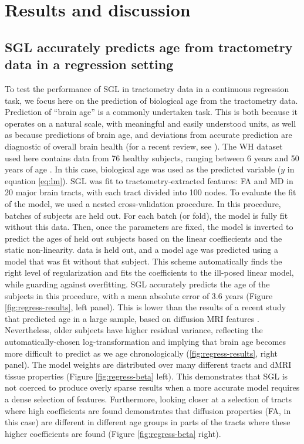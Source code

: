 \section*{Results and discussion}

\subsection*{SGL accurately predicts age from tractometry data in a regression setting}

To test the performance of SGL in tractometry data in a continuous regression
task, we focus here on the prediction of biological age from the tractometry
data. Prediction of ``brain age'' is a commonly undertaken task. This is both
because it operates on a natural scale, with meaningful and easily understood
units, as well as because predictions of brain age, and deviations from accurate
prediction are diagnostic of overall brain health (for a recent review, see
\cite{Cole2019-rz}). The WH dataset used here contains data from 76 healthy
subjects, ranging between 6 years and 50 years of age
\cite{yeatman2014lifespan}. In this case, biological age was used as the
predicted variable ($y$ in equation \ref{eq:lm}). SGL was fit to
tractometry-extracted features: FA and MD in 20 major brain tracts, with each
tract divided into 100 nodes. To evaluate the fit of the model, we used a nested
cross-validation procedure. In this procedure, batches of subjects are held out.
For each batch (or fold), the model is fully fit without this data. Then, once
the parameters are fixed, the model is inverted to predict the ages of held out
subjects based on the linear coeffiecients and the static non-linearity. data is
held out, and a model age was predicted using a model that was fit without that
subject. This scheme automatically finds the right level of regularization and
fits the coefficients to the ill-posed linear model, while guarding against
overfitting. SGL accurately predicts the age of the subjects in this procedure,
with a mean absolute error of 3.6 years (Figure \ref{fig:regress-results}, left
panel). This is lower than the results of a recent study that predicted age in a
large sample, based on diffusion MRI features \cite{Richard2018-ux}.
Nevertheless, older subjects have higher residual variance, reflecting the
automatically-chosen log-transformation and implying that brain age becomes more
difficult to predict as we age chronologically (\ref{fig:regress-results}, right
panel). The model weights are distributed over many different tracts and dMRI
tissue properties (Figure \ref{fig:regress-beta} left). This demonstrates that
SGL is not coerced to produce overly sparse results when a more accurate model
requires a dense selection of features. Furthermore, looking closer at a
selection of tracts where high coefficients are found demonstrates that
diffusion properties (FA, in this case) are different in different age groups in
parts of the tracts where these higher coefficients are found (Figure
\ref{fig:regress-beta} right).



